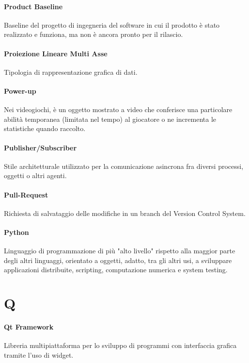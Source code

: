 \documentclass[]{article}
\begin{document}
	\paragraph*{Product Baseline}
	Baseline del progetto di ingegneria del software in cui il prodotto è stato realizzato e funziona, ma non è ancora pronto per il rilascio.
	
	\paragraph*{Proiezione Lineare Multi Asse}
	Tipologia di rappresentazione grafica di dati.
	
	\paragraph*{Power-up}
	Nei videogiochi, è un oggetto mostrato a video che conferisce una particolare abilità temporanea (limitata nel tempo) al giocatore o ne incrementa le statistiche quando raccolto.
	
	\paragraph*{Publisher/Subscriber}
	Stile architetturale utilizzato per la comunicazione asincrona fra diversi processi, oggetti o altri agenti.
	
	\paragraph*{Pull-Request}
	Richiesta di salvataggio delle modifiche in un branch del Version Control System.
	
	\paragraph*{Python}
	Linguaggio di programmazione di più "alto livello" rispetto alla maggior parte degli altri linguaggi, orientato a oggetti, adatto, tra gli altri usi, a sviluppare applicazioni distribuite, scripting, computazione numerica e system testing.
	
	\newpage
	
	\section*{Q}
	
	\paragraph*{Qt Framework}
	Libreria multipiattaforma per lo sviluppo di programmi con interfaccia grafica tramite l'uso di widget.
	
\end{document}

